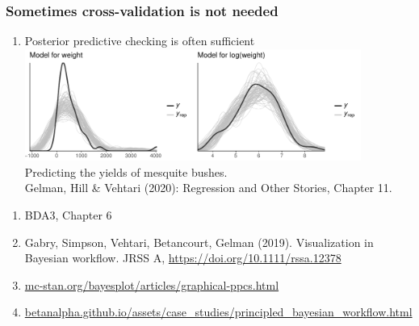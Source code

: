 \documentclass[10pt]{beamer}
\begin{document}
\begin{frame}

\frametitle{ Sometimes cross-validation is not needed}

\vspace{-0.5\baselineskip}

  \begin{enumerate}
  \item<2-> Posterior predictive checking is often sufficient\\
    \vspace{0.5\baselineskip}
    \includegraphics[width=11cm]{figs/mesquite_ppc.pdf}\\
  \vspace{-0.1\baselineskip} {Predicting the yields of mesquite bushes.\\
    \color{gray} \footnotesize
    Gelman, Hill \& Vehtari (2020): Regression and Other Stories, Chapter 11.}\\
  \vspace{-0.8\baselineskip}
\end{enumerate}
{\footnotesize
  \begin{enumerate}
  \item<3-> BDA3, Chapter 6
  \vspace{-0.6\parskip}
  \item<3-> Gabry, Simpson, Vehtari, Betancourt, Gelman
    (2019). Visualization in Bayesian workflow. JRSS A, \url{https://doi.org/10.1111/rssa.12378}
  \vspace{-0.6\parskip}
  \item<3-> \url{mc-stan.org/bayesplot/articles/graphical-ppcs.html}
  \vspace{-0.6\parskip}
  \item<3-> \url{betanalpha.github.io/assets/case_studies/principled_bayesian_workflow.html}
   \end{enumerate}}
\end{frame}



\end{document}
